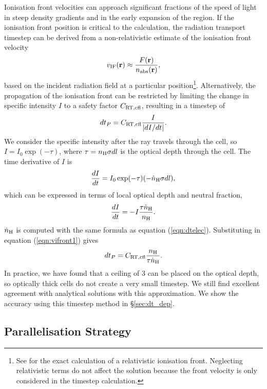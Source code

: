 \documentclass[useAMS,usenatbib]{mn2e}
\begin{document}
Ionisation front velocities can approach significant fractions of the
speed of light in steep density gradients and in the early expansion
of the \hii region.  If the ionisation front position is critical to
the calculation, the radiation transport timestep can be derived from
a non-relativistic estimate of the ionisation front velocity
%
\begin{equation}
  \label{eqn:dt_incident}
  v_{\rm IF}(\mathbf{r}) \approx \frac{F(\mathbf{r})}
  {n_{\rm abs}(\mathbf{r})},
\end{equation}
%
based on the incident radiation field at a particular
position\footnote{See \citet{Shapiro06} for the exact calculation of a
  relativistic ionisation front.  Neglecting relativistic terms do not
  affect the solution because the front velocity is only considered in
  the timestep calculation.}.  Alternatively, the propagation of the
ionisation front can be restricted by limiting the change in specific
intensity $I$ to a safety factor $C_{\rm RT,cfl}$, resulting in a
timestep of
%
\begin{equation}
  \label{eqn:vifront1}
  dt_P = C_{\rm RT,cfl} \frac{I}{|dI/dt|}.
\end{equation}
%
We consider the specific intensity after the ray travels through the
cell, so $I = I_0 \exp(-\tau)$, where $\tau = n_{\rm H} \sigma dl$ is
the optical depth through the cell.  The time derivative of $I$ is
%
\begin{equation}
  \label{eqn:vifront2}
  \frac{dI}{dt} = I_0 \exp(-\tau) (-\dot{n}_{\rm H} \sigma dl),
\end{equation}
%
which can be expressed in terms of local optical depth and neutral
fraction,
\begin{equation}
  \label{eqn:vifront3}
    \frac{dI}{dt} = -I \frac{\tau \dot{n}_{\rm H}}{n_{\rm H}}.
\end{equation}
%
$\dot{n}_{\rm H}$ is computed with the same formula as equation
(\ref{eqn:dtelec}). Substituting in equation (\ref{eqn:vifront1})
gives
%
\begin{equation}
  \label{eqn:vifront4}
  dt_P = C_{\rm RT,cfl} \frac{n_{\rm H}}{\tau \dot{n}_{\rm H}}.
\end{equation}
%
In practice, we have found that a ceiling of 3 can be placed on the
optical depth, so optically thick cells do not create a very small
timestep.  We still find excellent agreement with analytical solutions
with this approximation.  We show the accuracy using this timestep
method in \S\ref{sec:dt_dep}.

\subsection{Parallelisation Strategy}
\label{sec:parallel}
\end{document}

